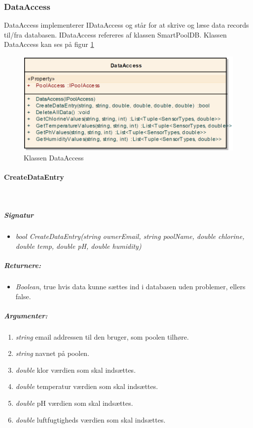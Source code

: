 \subsubsection{DataAccess}
DataAccess implementerer IDataAccess og står for at skrive og læse data records til/fra databasen.
IDataAccess refereres af klassen SmartPoolDB. Klassen DataAccess kan ses på figur \ref{fig:dataAccessClassNoInherit}

\begin{figure}
\centering
\includegraphics[width=0.7\linewidth]{figs/implementering/dataAccessClassNoInherit}
\caption{Klassen DataAccess}
\label{fig:dataAccessClassNoInherit}
\end{figure}

\paragraph{CreateDataEntry}\ %

\subparagraph{Signatur}
\begin{itemize}
	\item \textit{bool CreateDataEntry(string ownerEmail, string poolName, double chlorine, double temp, double pH, double humidity)}
\end{itemize}

\subparagraph{Returnere:}
\begin{itemize}
	\item \textit{Boolean}, true hvis data kunne sættes ind i databasen uden problemer, ellers false.
\end{itemize}

\subparagraph{Argumenter:}
\begin{enumerate}
	\item \textit{string} email addressen til den bruger, som poolen tilhøre.
	\item \textit{string} navnet på poolen.
	\item \textit{double} klor værdien som skal indsættes.
	\item \textit{double} temperatur værdien som skal indsættes.
	\item \textit{double} pH værdien som skal indsættes.
	\item \textit{double} luftfugtigheds værdien som skal indsættes.
\end{enumerate}

